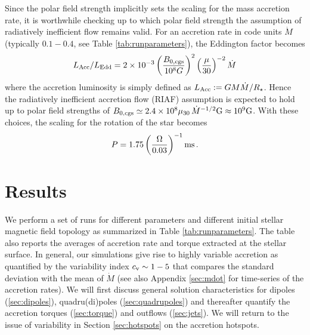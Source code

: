 \documentclass[fleqn,usenatbib]{mnras}
\begin{document}
Since the polar field strength implicitly sets the scaling for the mass accretion rate, it is worthwhile checking up to which polar field strength the assumption of radiatively inefficient flow remains valid.  For an accretion rate in code units $\dot{M}$ (typically $0.1-0.4$, see Table \ref{tab:runparameters}), the Eddington factor becomes 
\begin{align}
L_{\rm Acc}/L_{\rm Edd} = 2\times 10^{-3} \left(\frac{B_{0,\rm cgs}}{10^8 G}\right)^2 \left(\frac{\mu}{30}\right)^{-2} \dot{M}
\end{align}
where the accretion luminosity is simply defined as $L_{\rm Acc} := G M \dot{M} /R_{\star}$.  Hence the radiatively inefficient accretion flow (RIAF) assumption is expected to hold up to polar field strengths of $B_{0,\rm cgs}\simeq 2.4\times 10^{8} \mu_{30}\,\dot{M}^{-1/2}\rm G\approx 10^9 \rm G$.  
With these choices, the scaling for the rotation of the star becomes
\begin{align}
    P = 1.75 \left(\frac{\Omega}{0.03}\right)^{-1}\rm ms \, .
\end{align}


\section{Results}\label{sec:results}
We perform a set of runs for different parameters and different initial stellar magnetic field topology as summarized in Table \ref{tab:runparameters}.  The table also reports the averages of accretion rate and torque extracted at the stellar surface.  In general, our simulations give rise to highly variable accretion as quantified by the variability index $c_{\rm v}\sim 1-5$ that compares the standard deviation with the mean of $\dot{M}$ (see also Appendix \ref{sec:mdot} for  time-series of the accretion rates). 
We will first discuss general solution characteristics for dipoles (\ref{sec:dipoles}), quadru(di)poles (\ref{sec:quadrupoles}) and thereafter quantify the accretion torques (\ref{sec:torque}) and outflows (\ref{sec:jets}).  We will return to the issue of variability in Section \ref{sec:hotspots} on the accretion hotspots.  
\end{document}
